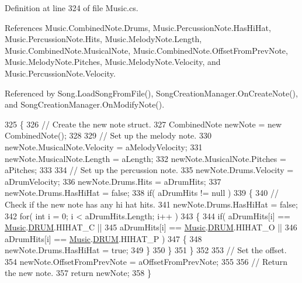 Definition at line 324 of file Music.\+cs.



References Music.\+Combined\+Note.\+Drums, Music.\+Percussion\+Note.\+Has\+Hi\+Hat, Music.\+Percussion\+Note.\+Hits, Music.\+Melody\+Note.\+Length, Music.\+Combined\+Note.\+Musical\+Note, Music.\+Combined\+Note.\+Offset\+From\+Prev\+Note, Music.\+Melody\+Note.\+Pitches, Music.\+Melody\+Note.\+Velocity, and Music.\+Percussion\+Note.\+Velocity.



Referenced by Song.\+Load\+Song\+From\+File(), Song\+Creation\+Manager.\+On\+Create\+Note(), and Song\+Creation\+Manager.\+On\+Modify\+Note().


\begin{DoxyCode}
325     \{
326         \textcolor{comment}{// Create the new note struct.}
327         CombinedNote newNote = \textcolor{keyword}{new} CombinedNote();
328 
329         \textcolor{comment}{// Set up the melody note.}
330         newNote.MusicalNote.Velocity = aMelodyVelocity;
331         newNote.MusicalNote.Length = aLength;
332         newNote.MusicalNote.Pitches = aPitches;
333 
334         \textcolor{comment}{// Set up the percussion note.}
335         newNote.Drums.Velocity = aDrumVelocity;
336         newNote.Drums.Hits = aDrumHits;
337         newNote.Drums.HasHiHat = \textcolor{keyword}{false};
338         \textcolor{keywordflow}{if}( aDrumHits != null )
339         \{
340             \textcolor{comment}{// Check if the new note has any hi hat hits.}
341             newNote.Drums.HasHiHat = \textcolor{keyword}{false};
342             \textcolor{keywordflow}{for}( \textcolor{keywordtype}{int} i = 0; i < aDrumHits.Length; i++ )
343             \{
344                 \textcolor{keywordflow}{if}( aDrumHits[i] == \hyperlink{class_music}{Music}.\hyperlink{group___music_enums_gade475b4382c7066d1af13e7c13c029b6}{DRUM}.HIHAT\_C ||
345                     aDrumHits[i] == \hyperlink{class_music}{Music}.\hyperlink{group___music_enums_gade475b4382c7066d1af13e7c13c029b6}{DRUM}.HIHAT\_O ||
346                     aDrumHits[i] == \hyperlink{class_music}{Music}.\hyperlink{group___music_enums_gade475b4382c7066d1af13e7c13c029b6}{DRUM}.HIHAT\_P )
347                 \{
348                     newNote.Drums.HasHiHat = \textcolor{keyword}{true};
349                 \}
350             \}
351         \}
352 
353         \textcolor{comment}{// Set the offset.}
354         newNote.OffsetFromPrevNote = aOffsetFromPrevNote;
355 
356         \textcolor{comment}{// Return the new note.}
357         \textcolor{keywordflow}{return} newNote;
358     \}
\end{DoxyCode}
\mbox{\label{group___music_stat_func_gaf5f64ebe9a7e036e07f283e41f26d22b}} 
